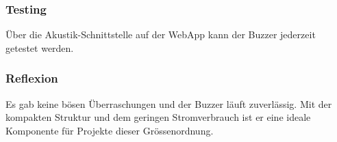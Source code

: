 \documentclass[../../main.tex]{subfiles}
\begin{document}
\subsubsection{Testing}
Über die Akustik-Schnittstelle auf der WebApp kann der Buzzer jederzeit getestet werden.

\subsubsection{Reflexion}
Es gab keine bösen Überraschungen und der Buzzer läuft zuverlässig. Mit der kompakten Struktur und dem geringen Stromverbrauch ist er eine ideale Komponente für Projekte dieser Grössenordnung.
\end{document}
